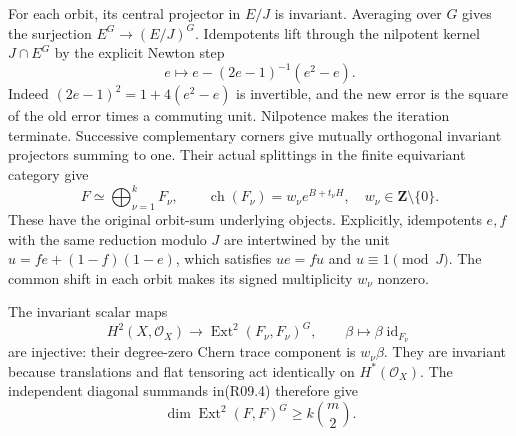 For each orbit, its central projector in $E/J$ is invariant.
Averaging over $G$ gives the surjection
$E^G\to(E/J)^G$. Idempotents lift through the nilpotent
kernel $J\cap E^G$ by the explicit Newton step
\[
                    e\longmapsto e-(2e-1)^{-1}(e^2-e).
                                                               \tag{R09.3}
\]
Indeed $(2e-1)^2=1+4(e^2-e)$ is invertible, and the new
error is the square of the old error times a commuting unit.
Nilpotence makes the iteration terminate. Successive
complementary corners give mutually orthogonal invariant
projectors summing to one. Their actual splittings in the
finite equivariant category give
\[
                 F\simeq\bigoplus_{\nu=1}^kF_\nu,
           \qquad\operatorname{ch}(F_\nu)=w_\nu e^{B+t_\nu H},
           \quad w_\nu\in\mathbf Z\setminus\{0\}.          \tag{R09.4}
\]
These have the original orbit-sum underlying objects. Explicitly,
idempotents $e,f$ with the same reduction modulo $J$ are
intertwined by the unit $u=fe+(1-f)(1-e)$, which satisfies
$ue=fu$ and $u\equiv1\pmod J$. The common shift in each
orbit makes its signed multiplicity $w_\nu$ nonzero.

The invariant scalar maps
\[
 H^2(X,\mathcal O_X)\longrightarrow
            \operatorname{Ext}^2(F_\nu,F_\nu)^G,
              \qquad\beta\longmapsto\beta\operatorname{id}_{F_\nu}
                                                               \tag{R09.5}
\]
are injective: their degree-zero Chern trace component is
$w_\nu\beta$. They are invariant because translations and
flat tensoring act identically on $H^*(\mathcal O_X)$.
The independent diagonal summands in(R09.4) therefore give
\[
                  \dim\operatorname{Ext}^2(F,F)^G
                                      \ge k\binom m2.        \tag{R09.6}
\]


